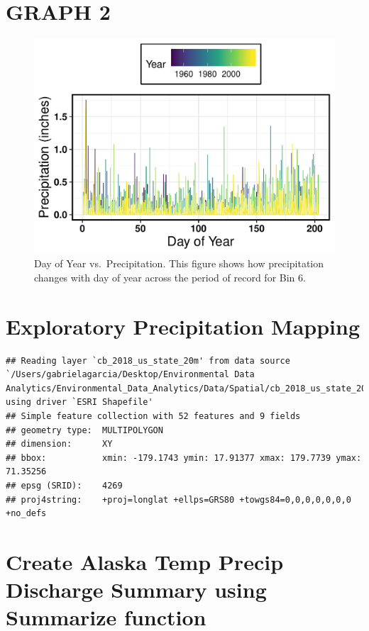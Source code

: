 \documentclass[12pt,]{article}
\begin{document}
\hypertarget{graph-2}{%
\section{GRAPH 2}\label{graph-2}}

\begin{figure}
\centering
\includegraphics{Project_Report_v2_files/figure-latex/unnamed-chunk-3-1.pdf}
\caption{Day of Year vs.~Precipitation. This figure shows how
precipitation changes with day of year across the period of record for
Bin 6.}
\end{figure}

\hypertarget{exploratory-precipitation-mapping}{%
\section{Exploratory Precipitation
Mapping}\label{exploratory-precipitation-mapping}}

\begin{verbatim}
## Reading layer `cb_2018_us_state_20m' from data source `/Users/gabrielagarcia/Desktop/Environmental Data Analytics/Environmental_Data_Analytics/Data/Spatial/cb_2018_us_state_20m.shp' using driver `ESRI Shapefile'
## Simple feature collection with 52 features and 9 fields
## geometry type:  MULTIPOLYGON
## dimension:      XY
## bbox:           xmin: -179.1743 ymin: 17.91377 xmax: 179.7739 ymax: 71.35256
## epsg (SRID):    4269
## proj4string:    +proj=longlat +ellps=GRS80 +towgs84=0,0,0,0,0,0,0 +no_defs
\end{verbatim}

\hypertarget{create-alaska-temp-precip-discharge-summary-using-summarize-function}{%
\section{Create Alaska Temp Precip Discharge Summary using Summarize
function}\label{create-alaska-temp-precip-discharge-summary-using-summarize-function}}
\end{document}
